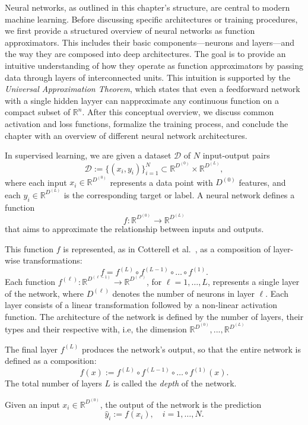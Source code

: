 Neural networks, as outlined in this chapter’s structure, are central to modern machine learning.
Before discussing specific architectures or training procedures, we first provide a structured overview of neural networks as function approximators. 
This includes their basic components—neurons and layers—and the way they are composed into deep architectures.
The goal is to provide an intuitive understanding of how they operate as function approximators by passing data through layers of interconnected units.
This intuition is supported by the \emph{Universal Approximation Theorem}, which states that even a feedforward network with a single hidden layyer can napproximate any continuous function on a compact subset of $\mathbb{R}^n$.
After this conceptual overview, we discuss common activation and loss functions, formalize the training process, and conclude the chapter with an overview of different neural network architectures.

In supervised learning, we are given a dataset $\mathcal{D}$ of $N$ input-output pairs 
\[\mathcal{D}:=\{(x_i,y_i)\}_{i=1}^N \subset \mathbb{R}^{D^{(0)}} \times \mathbb{R}^{D^{(L)}},\]
where each input $x_i\in \mathbb{R}^{D^{(0)}}$ represents a data point with $D^{(0)}$ features, and each $y_i\in \mathbb{R}^{D^{(L)}}$ is the corresponding target or label.
A neural network defines a function \[f:\mathbb{R}^{D^{(0)}} \to \mathbb{R}^{D^{(L)}}\] that aims to approximate the relationship between inputs and outputs.

This function $f$ is represented, as in Cotterell et al.~\cite{cotterell_formal_2024}, as a composition of layer-wise transformations: 
\[
f = f^{(L)} \circ f^{(L-1)} \circ \dots \circ f^{(1)}.
\]
Each function \( f^{(\ell)} : \mathbb{R}^{D^{(\ell-1)}} \rightarrow \mathbb{R}^{D^{(\ell)}} \), for \( \ell = 1, \dots, L \), represents a single layer of the network, where \( D^{(\ell)} \) denotes the number of neurons in layer \( \ell \).  
Each layer consists of a linear transformation followed by a non-linear activation function.
The architecture of the network is defined by the number of layers, their types and their respective with, i.e, the dimension $\mathbb{R}^{D^{(0)}}, ..., \mathbb{R}^{D^{(L)}}$

The final layer \( f^{(L)} \) produces the network’s output, so that the entire network is defined as a composition:
\[
f(x) := f^{(L)} \circ f^{(L-1)} \circ \dots \circ f^{(1)}(x).
\]
The total number of layers \( L \) is called the \emph{depth} of the network.

Given an input \( x_i \in \mathbb{R}^{D^{(0)}} \), the output of the network is the prediction
\[
\hat{y}_i := f(x_i), \quad i = 1, \dots, N.
\]


